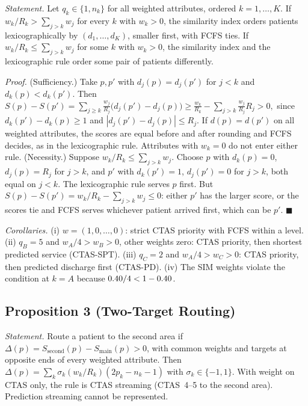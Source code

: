 \emph{Statement.} Let $q_k\in\{1,n_k\}$ for all weighted attributes, ordered $k=1,\dots,K$. If $w_k/R_k>\sum_{j>k}w_j$ for every $k$ with $w_k>0$, the similarity index orders patients lexicographically by $(d_1,\dots,d_K)$, smaller first, with FCFS ties. If $w_k/R_k\le\sum_{j>k}w_j$ for some $k$ with $w_k>0$, the similarity index and the lexicographic rule order some pair of patients differently.

\emph{Proof.} (Sufficiency.) Take $p,p'$ with $d_j(p)=d_j(p')$ for $j<k$ and $d_k(p)<d_k(p')$. Then
$S(p)-S(p')=\sum_{j\ge k}\frac{w_j}{R_j}\big(d_j(p')-d_j(p)\big)\ge \frac{w_k}{R_k}-\sum_{j>k}\frac{w_j}{R_j}R_j>0,$
since $d_k(p')-d_k(p)\ge1$ and $|d_j(p')-d_j(p)|\le R_j$. If $d(p)=d(p')$ on all weighted attributes, the scores are equal before and after rounding and FCFS decides, as in the lexicographic rule. Attributes with $w_k=0$ do not enter either rule.
(Necessity.) Suppose $w_k/R_k\le\sum_{j>k}w_j$. Choose $p$ with $d_k(p)=0$, $d_j(p)=R_j$ for $j>k$, and $p'$ with $d_k(p')=1$, $d_j(p')=0$ for $j>k$, both equal on $j<k$. The lexicographic rule serves $p$ first. But $S(p)-S(p')=w_k/R_k-\sum_{j>k}w_j\le0$: either $p'$ has the larger score, or the scores tie and FCFS serves whichever patient arrived first, which can be $p'$. \hfill$\blacksquare$

\emph{Corollaries.} (i) $w=(1,0,\dots,0)$: strict CTAS priority with FCFS within a level. (ii) $q_B=5$ and $w_A/4>w_B>0$, other weights zero: CTAS priority, then shortest predicted service (CTAS-SPT). (iii) $q_C=2$ and $w_A/4>w_C>0$: CTAS priority, then predicted discharge first (CTAS-PD). (iv) The SIM weights violate the condition at $k=A$ because $0.40/4<1-0.40$.

\subsection{Proposition 3 (Two-Target Routing)}

\emph{Statement.} Route a patient to the second area if $\Delta(p)=S_{\text{second}}(p)-S_{\text{main}}(p)>0$, with common weights and targets at opposite ends of every weighted attribute. Then $\Delta(p)=\sum_k\sigma_k(w_k/R_k)(2p_k-n_k-1)$ with $\sigma_k\in\{-1,1\}$. With weight on CTAS only, the rule is CTAS streaming (CTAS~4--5 to the second area). Prediction streaming cannot be represented.

